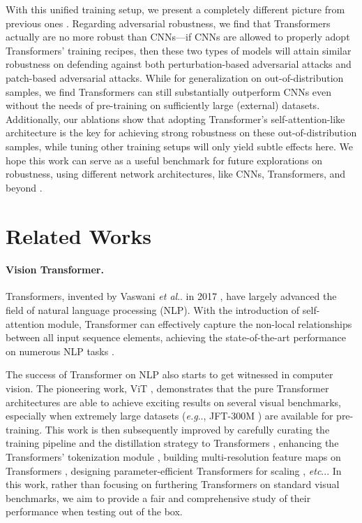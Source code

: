 \documentclass{article}
\makeatletter
\def\vs{{\bm{s}}}
\DeclareRobustCommand\onedot{\futurelet\@let@token\@onedot}
\def\@onedot{\ifx\@let@token.\else.\null\fi\xspace}
\def\eg{\emph{e.g}\onedot} \def\Eg{\emph{E.g}\onedot}
\def\etc{\emph{etc}\onedot} \def\vs{\emph{vs}\onedot}
\def\etal{\emph{et al}\onedot}
\makeatother
\begin{document}
With this unified training setup, we present a completely different picture from previous ones \cite{shao2021adversarial,bhojanapalli2021understanding}. Regarding adversarial robustness, we find that Transformers actually are no more robust than CNNs---if CNNs 
are allowed to properly adopt Transformers' training recipes, then these two types of models will attain similar robustness on defending against both perturbation-based adversarial attacks and patch-based adversarial attacks.
While for generalization on out-of-distribution samples, we find Transformers can still substantially outperform CNNs even without the needs of pre-training on sufficiently large (external) datasets. Additionally, our ablations show that adopting Transformer's self-attention-like architecture is the key for achieving strong robustness on these out-of-distribution samples, while tuning other training setups will only yield subtle effects here. We hope this work can serve as a useful benchmark for future explorations on robustness, using different network architectures, like CNNs, Transformers, and beyond \cite{tolstikhin2021mlp,liu2021pay}.



\section{Related Works}
\paragraph{Vision Transformer.}
Transformers, invented by Vaswani \etal in 2017 \cite{Vaswani2017}, have largely advanced the field of natural language processing (NLP). With the introduction of self-attention module, Transformer can effectively capture the non-local relationships between all input sequence elements, achieving the state-of-the-art performance on numerous NLP tasks \cite{yang2019xlnet, dai2019Transformer, brown2020language, devlin2018bert, radford2018improving, radford2019language}.

The success of Transformer on NLP also starts to get witnessed in computer vision. The pioneering work, ViT \cite{dosovitskiy2020image}, demonstrates that the pure Transformer architectures are able to achieve exciting results on several visual benchmarks, especially when extremely large datasets (\eg, JFT-300M \cite{sun2017revisiting}) are available for pre-training. This work is then subsequently improved by carefully curating the training pipeline and the distillation strategy to Transformers \cite{touvron2020training}, enhancing the Transformers' tokenization module \cite{yuan2021tokens}, building multi-resolution feature maps on Transformers \cite{liu2021swin,wang2021pyramid}, designing parameter-efficient Transformers for scaling \cite{zhai2021scaling,touvron2021going,xue2021go}, \etc. In this work, rather than focusing on furthering Transformers on standard visual benchmarks, we aim to provide a fair and comprehensive study of their performance when testing out of the box.
\end{document}
